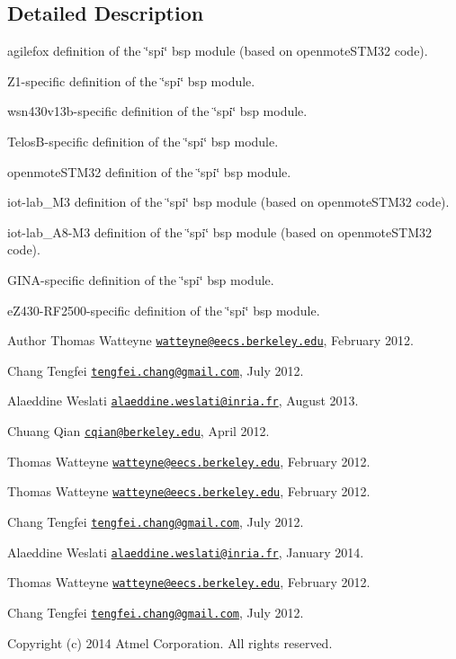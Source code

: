 \subsection{Detailed Description}
agilefox definition of the \char`\"{}spi\char`\"{} bsp module (based on openmote\+S\+T\+M32 code). 

Z1-\/specific definition of the \char`\"{}spi\char`\"{} bsp module.

wsn430v13b-\/specific definition of the \char`\"{}spi\char`\"{} bsp module.

Telos\+B-\/specific definition of the \char`\"{}spi\char`\"{} bsp module.

openmote\+S\+T\+M32 definition of the \char`\"{}spi\char`\"{} bsp module.

iot-\/lab\+\_\+\+M3 definition of the \char`\"{}spi\char`\"{} bsp module (based on openmote\+S\+T\+M32 code).

iot-\/lab\+\_\+\+A8-\/\+M3 definition of the \char`\"{}spi\char`\"{} bsp module (based on openmote\+S\+T\+M32 code).

G\+I\+N\+A-\/specific definition of the \char`\"{}spi\char`\"{} bsp module.

e\+Z430-\/\+R\+F2500-\/specific definition of the \char`\"{}spi\char`\"{} bsp module.

\begin{DoxyAuthor}{Author}
Thomas Watteyne \href{mailto:watteyne@eecs.berkeley.edu}{\tt watteyne@eecs.\+berkeley.\+edu}, February 2012. 

Chang Tengfei \href{mailto:tengfei.chang@gmail.com}{\tt tengfei.\+chang@gmail.\+com}, July 2012. 

Alaeddine Weslati \href{mailto:alaeddine.weslati@inria.fr}{\tt alaeddine.\+weslati@inria.\+fr}, August 2013.

Chuang Qian \href{mailto:cqian@berkeley.edu}{\tt cqian@berkeley.\+edu}, April 2012.

Thomas Watteyne \href{mailto:watteyne@eecs.berkeley.edu}{\tt watteyne@eecs.\+berkeley.\+edu}, February 2012.

Thomas Watteyne \href{mailto:watteyne@eecs.berkeley.edu}{\tt watteyne@eecs.\+berkeley.\+edu}, February 2012. 

Chang Tengfei \href{mailto:tengfei.chang@gmail.com}{\tt tengfei.\+chang@gmail.\+com}, July 2012. 

Alaeddine Weslati \href{mailto:alaeddine.weslati@inria.fr}{\tt alaeddine.\+weslati@inria.\+fr}, January 2014.

Thomas Watteyne \href{mailto:watteyne@eecs.berkeley.edu}{\tt watteyne@eecs.\+berkeley.\+edu}, February 2012. 

Chang Tengfei \href{mailto:tengfei.chang@gmail.com}{\tt tengfei.\+chang@gmail.\+com}, July 2012.
\end{DoxyAuthor}
Copyright (c) 2014 Atmel Corporation. All rights reserved.

